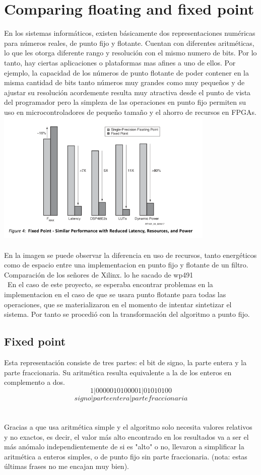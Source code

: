 \cleardoublepage
\chapter{Comparing floating and fixed point}
\label{makereference}

En los sistemas informáticos, existen básicamente dos representaciones numéricas para números reales, de punto fijo y flotante. Cuentan con diferentes aritméticas, lo que les otorga diferente rango y resolución con el mismo numero de bits. Por lo tanto, hay ciertas aplicaciones o plataformas mas afines a uno de ellos. Por ejemplo, la capacidad de los números de punto flotante de poder contener en la misma cantidad de bits tanto números muy grandes como muy pequeños y de ajustar su resolución acordemente resulta muy atractiva desde el punto de vista del programador pero la simpleza de las operaciones en punto fijo permiten su uso en microcontroladores de pequeño tamaño y el ahorro de recursos en FPGAs.
\\
\includegraphics[height=2.5in]{figures/fp_vs_fp.png}
\\
\\
En la imagen se puede observar la diferencia en uso de recursos, tanto energéticos como de espacio entre una implementacion en punto fijo y flotante de un filtro.
Comparación de los señores de Xilinx. lo he sacado de wp491
\\\
En el caso de este proyecto, se esperaba encontrar problemas en la implementacion en el caso de que se usara punto flotante para todas las operaciones, que se materializaron en el momento de intentar sintetizar el sistema. Por tanto se procedió con la transformación del algoritmo a punto fijo.

\section{Fixed point}
Esta representación consiste de tres partes: el bit de signo, la parte entera y la parte fraccionaria. Su aritmética resulta equivalente a la de los enteros en complemento a dos.
\[1 | 0000010100001 | 01010100\]
\[signo | parte entera | parte fraccionaria\]
\\
\\
Gracias a que usa aritmética simple y el algoritmo solo necesita valores relativos y no exactos, es decir, el valor más alto encontrado en los resultados va a ser el más anómalo independientemente de si es "alto" o no, llevaron a simplificar la aritmética a enteros simples, o de punto fijo sin parte fraccionaria. (nota: estas últimas frases no me encajan muy bien).


